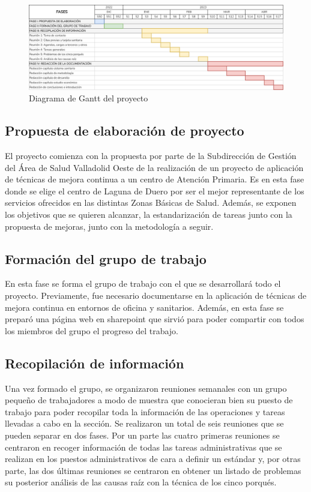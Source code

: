 \begin{figure}[H]
    \centering
    \includegraphics[width=\textwidth]{img/gantt-diagram.png}
    \caption{Diagrama de Gantt del proyecto}
    \label{fig:gantt}
\end{figure}

\subsection{Propuesta de elaboración de proyecto}

El proyecto comienza con la propuesta por parte de la Subdirección de Gestión del Área de Salud Valladolid Oeste de la realización de un proyecto de aplicación de técnicas de mejora continua a un centro de Atención Primaria.
Es en esta fase donde se elige el centro de Laguna de Duero por ser el mejor representante de los servicios ofrecidos en las distintas Zonas Básicas de Salud.
Además, se exponen los objetivos que se quieren alcanzar, la estandarización de tareas junto con la propuesta de mejoras, junto con la metodología a seguir.

\subsection{Formación del grupo de trabajo}

En esta fase se forma el grupo de trabajo con el que se desarrollará todo el proyecto.
Previamente, fue necesario documentarse en la aplicación de técnicas de mejora continua en entornos de oficina y sanitarios.
Además, en esta fase se preparó una página web en \Gls{sharepoint} que sirvió para poder compartir con todos los miembros del grupo el progreso del trabajo.

\subsection{Recopilación de información}

Una vez formado el grupo, se organizaron reuniones semanales con un grupo pequeño de trabajadores a modo de muestra que conocieran bien su puesto de trabajo para poder recopilar toda la información de las operaciones y tareas llevadas a cabo en la sección.
Se realizaron un total de seis reuniones que se pueden separar en dos fases.
Por un parte las cuatro primeras reuniones se centraron en recoger información de todas las tareas administrativas que se realizan en los puestos administrativos de cara a definir un estándar y, por otras parte, las dos últimas reuniones se centraron en obtener un listado de problemas su posterior análisis de las causas raíz con la técnica de los cinco porqués.

